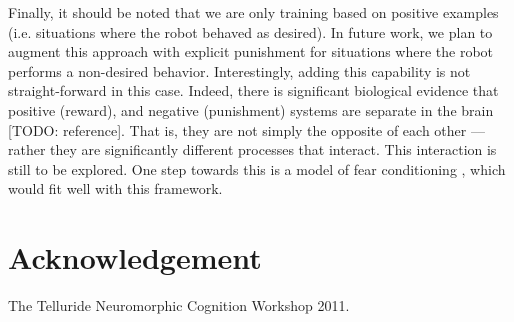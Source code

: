\documentclass[conference]{IEEEtran}
\begin{document}
Finally, it should be noted that we are only training based on positive 
examples (i.e. situations where the robot behaved as desired). In future work,
we plan to augment this approach with explicit punishment for situations where 
the robot performs a non-desired behavior. Interestingly, adding this capability
is not straight-forward in this case.  Indeed, there is significant biological 
evidence that positive (reward), and negative (punishment) systems are separate 
in the brain [TODO: reference]. That is, they are not simply the opposite of 
each other –-- rather they are significantly different processes that interact. 
This interaction is still to be explored. One step towards this is a model
of fear conditioning \cite{kolbeck2013fear}, which would fit well with this framework.


\section*{Acknowledgement}

The Telluride Neuromorphic Cognition Workshop 2011. 




\end{document}
